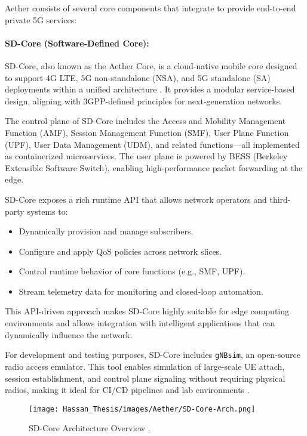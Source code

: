 Aether consists of several core components that integrate to provide end-to-end private 5G services:

\paragraph{SD-Core (Software-Defined Core):}

SD-Core, also known as the Aether Core, is a cloud-native mobile core designed to support 4G LTE, 5G non-standalone (NSA), and 5G standalone (SA) deployments within a unified architecture \cite{sdcore_whitepaper}. It provides a modular service-based design, aligning with 3GPP-defined principles for next-generation networks.

The control plane of SD-Core includes the Access and Mobility Management Function (AMF), Session Management Function (SMF), User Plane Function (UPF), User Data Management (UDM), and related functions—all implemented as containerized microservices. The user plane is powered by BESS (Berkeley Extensible Software Switch), enabling high-performance packet forwarding at the edge.

SD-Core exposes a rich runtime API that allows network operators and third-party systems to:
\begin{itemize}
    \item Dynamically provision and manage subscribers.
    \item Configure and apply QoS policies across network slices.
    \item Control runtime behavior of core functions (e.g., SMF, UPF).
    \item Stream telemetry data for monitoring and closed-loop automation.
\end{itemize}

This API-driven approach makes SD-Core highly suitable for edge computing environments and allows integration with intelligent applications that can dynamically influence the network.

For development and testing purposes, SD-Core includes \texttt{gNBsim}, an open-source radio access emulator. This tool enables simulation of large-scale UE attach, session establishment, and control plane signaling without requiring physical radios, making it ideal for CI/CD pipelines and lab environments \cite{sdcore_gnbsim}.

\begin{figure}[H]
    \centering
    \texttt{[image: Hassan\_Thesis/images/Aether/SD-Core-Arch.png]}
    \caption{SD-Core Architecture Overview \cite{sdcore_whitepaper}.}
    \label{fig:sdcore-arch}
\end{figure}


